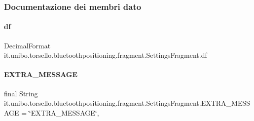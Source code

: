 \subsubsection{Documentazione dei membri dato}
\hypertarget{classit_1_1unibo_1_1torsello_1_1bluetoothpositioning_1_1fragment_1_1SettingsFragment_af6b80a700dc80c39a56d001b68a47694_af6b80a700dc80c39a56d001b68a47694}{}\label{classit_1_1unibo_1_1torsello_1_1bluetoothpositioning_1_1fragment_1_1SettingsFragment_af6b80a700dc80c39a56d001b68a47694_af6b80a700dc80c39a56d001b68a47694} 
\paragraph{\texorpdfstring{df}{df}}
{\footnotesize\ttfamily Decimal\+Format it.\+unibo.\+torsello.\+bluetoothpositioning.\+fragment.\+Settings\+Fragment.\+df\hspace{0.3cm}{\ttfamily [private]}}

\hypertarget{classit_1_1unibo_1_1torsello_1_1bluetoothpositioning_1_1fragment_1_1SettingsFragment_a3f3c627008cd1e176afc52642c73fd93_a3f3c627008cd1e176afc52642c73fd93}{}\label{classit_1_1unibo_1_1torsello_1_1bluetoothpositioning_1_1fragment_1_1SettingsFragment_a3f3c627008cd1e176afc52642c73fd93_a3f3c627008cd1e176afc52642c73fd93} 
\paragraph{\texorpdfstring{E\+X\+T\+R\+A\+\_\+\+M\+E\+S\+S\+A\+GE}{EXTRA\_MESSAGE}}
{\footnotesize\ttfamily final String it.\+unibo.\+torsello.\+bluetoothpositioning.\+fragment.\+Settings\+Fragment.\+E\+X\+T\+R\+A\+\_\+\+M\+E\+S\+S\+A\+GE = \char`\"{}E\+X\+T\+R\+A\+\_\+\+M\+E\+S\+S\+A\+GE\char`\"{}\hspace{0.3cm}{\ttfamily [static]}, {\ttfamily [private]}}

